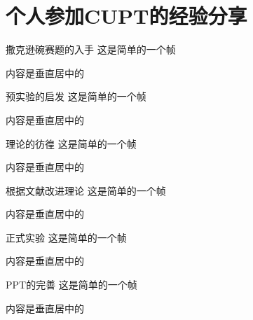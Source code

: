 \ifx\allfiles\undefined

\else
\fi

\section{个人参加CUPT的经验分享}
\begin{frame}{撒克逊碗赛题的入手}
	这是简单的一个帧
	
	内容是垂直居中的
\end{frame}

\begin{frame}{预实验的启发}
	这是简单的一个帧
	
	内容是垂直居中的
\end{frame}

\begin{frame}{理论的彷徨}
	这是简单的一个帧
	
	内容是垂直居中的
\end{frame}

\begin{frame}{根据文献改进理论}
	这是简单的一个帧
	
	内容是垂直居中的
\end{frame}

\begin{frame}{正式实验}
	这是简单的一个帧
	
	内容是垂直居中的
\end{frame}

\begin{frame}{PPT的完善}
	这是简单的一个帧
	
	内容是垂直居中的
\end{frame}



\ifx\allfiles\undefined

\fi